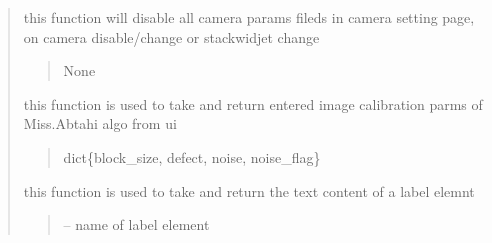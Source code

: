 \documentclass[letterpaper,10pt,english]{sphinxmanual}
\begin{document}
\begin{quote}
\begin{savenotes}
\begin{fulllineitems}
\begin{savenotes}\begin{fulllineitems}
\label{\detokenize{setting/setting_UI:oxin.setting_UI.UI_main_window.disable_camera_settings}}
\pysigstartsignatures
{}
\pysigstopsignatures
\sphinxAtStartPar
this function will disable all camera params fileds in camera setting page, on camera disable/change or stackwidjet change
\begin{quote}\begin{description}
\sphinxAtStartPar
None

\end{description}\end{quote}

\end{fulllineitems}\end{savenotes}


\begin{savenotes}\begin{fulllineitems}
\label{\detokenize{setting/setting_UI:oxin.setting_UI.UI_main_window.get_image_proccessing_parms}}
\pysigstartsignatures
{}
\pysigstopsignatures
\sphinxAtStartPar
this function is used to take and return entered image calibration parms of Miss.Abtahi algo from ui
\begin{quote}\begin{description}
\sphinxAtStartPar
dict\{block\_size, defect, noise, noise\_flag\}

\end{description}\end{quote}

\end{fulllineitems}\end{savenotes}


\begin{savenotes}\begin{fulllineitems}
\label{\detokenize{setting/setting_UI:oxin.setting_UI.UI_main_window.get_label}}
\pysigstartsignatures
{}
\pysigstopsignatures
\sphinxAtStartPar
this function is used to take and return the text content of a label elemnt
\begin{quote}\begin{description}
\sphinxAtStartPar
{} – name of label element


\end{description}
\end{quote}
\end{fulllineitems}
\end{savenotes}
\end{fulllineitems}
\end{savenotes}
\end{quote}
\end{document}
